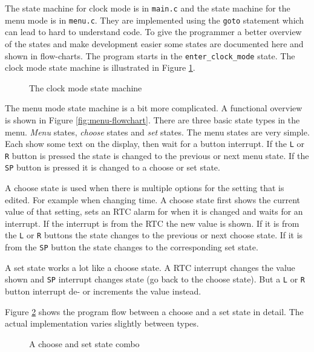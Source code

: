 \documentclass{awac02}
\begin{document}
The state machine for clock mode is in \texttt{main.c} and the state machine
for the menu mode is in \texttt{menu.c}. They are implemented using the
\texttt{goto} statement which can lead to hard to understand code.  To give the
programmer a better overview of the states and make development easier some
states are documented here and shown in flow-charts. The program starts in the
\texttt{enter\_clock\_mode} state. The clock mode state machine is illustrated
in Figure \ref{fig:clock-state}.

\begin{figure}[h]
    \centering
    
    \caption{The clock mode state machine}
    \label{fig:clock-state}
\end{figure}

The menu mode state machine is a bit more complicated. A functional overview is
shown in Figure \ref{fig:menu-flowchart}. There are three basic state types in the
menu. \emph{Menu} states, \emph{choose} states and \emph{set} states. The menu
states are very simple. Each show some text on the display, then wait for a
button interrupt. If the \texttt{L} or \texttt{R} button is pressed the
state is changed to the previous or next menu state. If the \texttt{SP} button
is pressed it is changed to a choose or set state.

A choose state is used when there is multiple options for the setting that is
edited. For example when changing time. A choose state first shows the current
value of that setting, sets an RTC alarm for when it is changed and waits for
an interrupt. If the interrupt is from the RTC the new value is shown. If it is
from the \texttt{L} or \texttt{R} buttons the state changes to the previous or
next choose state. If it is from the \texttt{SP} button the state changes to
the corresponding set state.

A set state works a lot like a choose state. A RTC interrupt changes the value
shown and \texttt{SP} interrupt changes state (go back to the choose state).
But a \texttt{L} or \texttt{R} button interrupt de- or increments the value
instead.

Figure \ref{fig:choose-and-set-state} shows the program flow between a choose
and a set state in detail. The actual implementation varies slightly
between types.

\begin{figure}[h]
    \centering
    
    \caption{A choose and set state combo}
    \label{fig:choose-and-set-state}
\end{figure}
\end{document}
